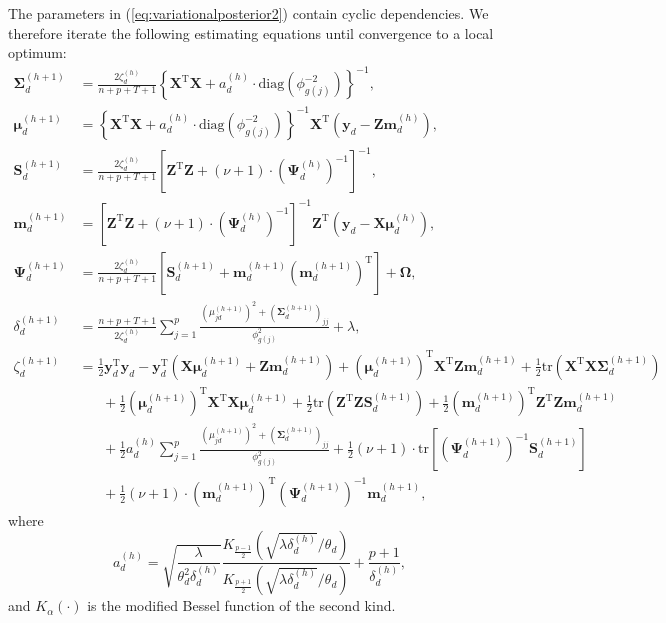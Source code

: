 \documentclass[a4paper,hidelinks]{article}\usepackage[]{graphicx}\usepackage[]{color}
\newcommand{\bSigma}{\bm{\Sigma}}
\newcommand{\bmu}{\bm{\mu}}
\newcommand{\y}{\mathbf{y}}
\newcommand{\X}{\mathbf{X}}
\newcommand{\Z}{\mathbf{Z}}
\newcommand{\Sm}{\mathbf{S}}
\newcommand{\0}{\bm{0}}
\newcommand{\tr}{^{\text{T}}}
\newcommand{\diag}{\text{diag}}
\newcommand{\trace}{\text{tr}}
\renewcommand{\(}{\left(}
\renewcommand{\)}{\right)}
\renewcommand{\[}{\left[}
\renewcommand{\]}{\right]}
\begin{document}
	The parameters in (\ref{eq:variationalposterior2}) contain cyclic dependencies. We therefore iterate the following estimating equations until convergence to a local optimum:
	\begin{align*}
	\bSigma_d^{(h+1)} & = \frac{2\zeta_d^{(h)}}{n+p+T+1} \left\{\X \tr \X + a_d^{(h)} \cdot \diag (\phi_{g(j)}^{-2}) \right\}^{-1}, \\
	\bm{\mu}_d^{(h+1)} & = \left\{\X \tr \X + a_d^{(h)} \cdot \diag (\phi_{g(j)}^{-2}) \right\}^{-1} \X \tr ( \y_d - \Z \mathbf{m}_d^{(h)}), \\
	\Sm_d^{(h+1)} & = \frac{2\zeta_d^{(h)}}{n+p+T+1} \[ \Z \tr \Z + (\nu + 1) \cdot (\bm{\Psi}_d^{(h)})^{-1} \]^{-1}, \\
	\mathbf{m}_d^{(h+1)} & = \[ \Z \tr \Z + (\nu + 1) \cdot (\bm{\Psi}_d^{(h)})^{-1} \]^{-1} \Z \tr (\y_d - \X \bm{\mu}_d^{(h)}), \\
	\bm{\Psi}_d^{(h+1)} & = \frac{2\zeta_d^{(h)}}{n+p+T+1} \[ \Sm_d^{(h+1)} + \mathbf{m}_d^{(h+1)} (\mathbf{m}_d^{(h+1)}) \tr \] + \bm{\Omega}, \\
	\delta_d^{(h+1)} & =  \frac{n+p+T+1}{2\zeta_d^{(h)}} \sum_{j=1}^p \frac{(\mu_{jd}^{(h+1)})^2 + (\bSigma_d^{(h+1)})_{jj}}{\phi^2_{g(j)}} + \lambda, \\
	\zeta_d^{(h+1)} & = \frac{1}{2} \y_d \tr \y_d - \y_d \tr (\X \bmu_d^{(h+1)} + \Z \mathbf{m}_d^{(h+1)}) + (\bmu_d^{(h+1)}) \tr \X \tr \Z \mathbf{m}_d^{(h+1)} + \frac{1}{2} \trace (\X \tr \X \bSigma_d^{(h+1)}) \\
	& \,\,\,\,\,\,\,\,\,\, + \frac{1}{2} (\bmu_d^{(h+1)}) \tr \X \tr \X \bmu_d^{(h+1)} + \frac{1}{2} \trace (\Z \tr \Z \Sm_d^{(h+1)}) + \frac{1}{2} (\mathbf{m}_d^{(h+1)}) \tr \Z \tr \Z \mathbf{m}_d^{(h+1)} \\
	& \,\,\,\,\,\,\,\,\,\, + \frac{1}{2} a_d^{(h)} \sum_{j=1}^p \frac{(\mu_{jd}^{(h+1)})^2 + (\bSigma_d^{(h+1)})_{jj}}{\phi^2_{g(j)}} + \frac{1}{2} (\nu + 1) \cdot \trace \[ (\bm{\Psi}_d^{(h+1)})^{-1} \Sm_d^{(h+1)} \] \\
	& \,\,\,\,\,\,\,\,\,\, + \frac{1}{2} (\nu + 1) \cdot (\mathbf{m}_d^{(h+1)}) \tr (\bm{\Psi}_d^{(h+1)})^{-1} \mathbf{m}_d^{(h+1)},
	\end{align*}
	where
	$$
	a_d^{(h)} = \sqrt{\frac{\lambda}{\theta^2_d \delta_d^{(h)}}} \frac{K_{\frac{p - 1}{2}} \( \sqrt{\lambda \delta_d^{(h)}}/\theta_d \)}{K_{\frac{p+1}{2}} \( \sqrt{\lambda \delta_d^{(h)}}/\theta_d \)} + \frac{p+1}{\delta_d^{(h)}},
	$$
	and $K_{\alpha}(\cdot)$ is the modified Bessel function of the second kind.
	
\end{document}
